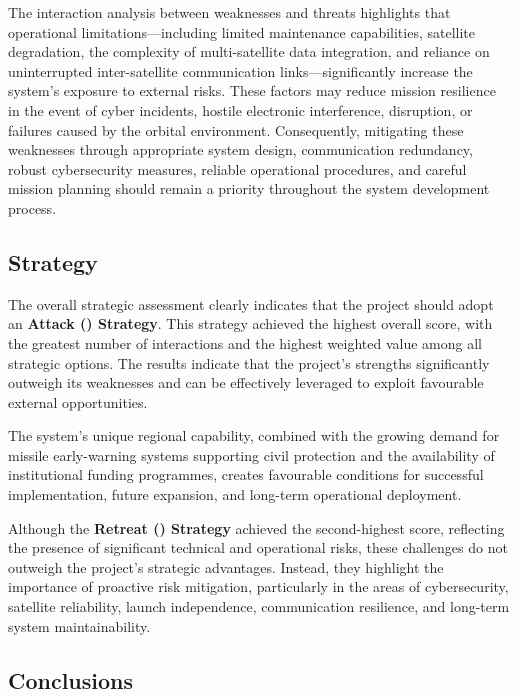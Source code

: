 The interaction analysis between weaknesses and threats highlights that operational limitations---including limited maintenance capabilities, satellite degradation, the complexity of multi-satellite data integration, and reliance on uninterrupted inter-satellite communication links---significantly increase the system's exposure to external risks. These factors may reduce mission resilience in the event of cyber incidents, hostile electronic interference,  disruption, or failures caused by the orbital environment. Consequently, mitigating these weaknesses through appropriate system design, communication redundancy, robust cybersecurity measures, reliable operational procedures, and careful mission planning should remain a priority throughout the system development process.

\subsection{Strategy}

The overall strategic assessment clearly indicates that the project should adopt an \textbf{Attack () Strategy}. This strategy achieved the highest overall score, with the greatest number of interactions and the highest weighted value among all strategic options. The results indicate that the project's strengths significantly outweigh its weaknesses and can be effectively leveraged to exploit favourable external opportunities.

The system's unique regional capability, combined with the growing demand for missile early-warning systems supporting civil protection and the availability of institutional funding programmes, creates favourable conditions for successful implementation, future expansion, and long-term operational deployment.

Although the \textbf{Retreat () Strategy} achieved the second-highest score, reflecting the presence of significant technical and operational risks, these challenges do not outweigh the project's strategic advantages. Instead, they highlight the importance of proactive risk mitigation, particularly in the areas of cybersecurity, satellite reliability, launch independence, communication resilience, and long-term system maintainability.

\subsection{Conclusions}

